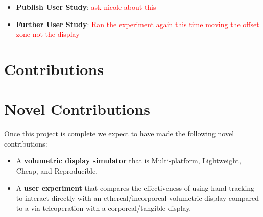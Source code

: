 \begin{itemize}
	\item \textbf{Publish User Study}: \textcolor{red}{ask nicole about this}
	
	\item \textbf{Further User Study}: \textcolor{red}{Ran the experiment again this time moving the offset zone not the display}
\end{itemize}

\section{Contributions}
\section{Novel Contributions}
Once this project is complete we expect to have made the following novel contributions:
\begin{itemize}
    \item A \textbf{volumetric display simulator} that is Multi-platform, Lightweight, Cheap, and Reproducible.
    \item A \textbf{user experiment} that compares the effectiveness of using hand tracking to interact directly with an ethereal/incorporeal volumetric display compared to a via teleoperation with a corporeal/tangible display.
\end{itemize}